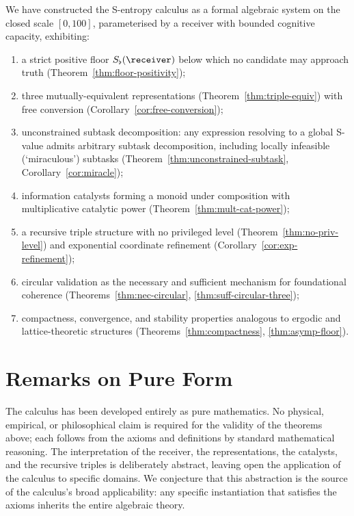 \documentclass[11pt,a4paper]{article}
\theoremstyle{thmstyle}
\theoremstyle{thmstyle}
\theoremstyle{definition}
\theoremstyle{remark}
\newcommand{\Sfloor}{S_{\flat}}
\begin{document}
We have constructed the S-entropy calculus as a
formal algebraic system on the closed scale
$[0, 100]$, parameterised by a receiver with
bounded cognitive capacity, exhibiting:

\begin{enumerate}[label=\textbf{(\arabic*)},leftmargin=*]
\item a strict positive floor $\Sfloor(\receiver)$
      below which no candidate may approach truth
      (Theorem~\ref{thm:floor-positivity});
\item three mutually-equivalent representations
      (Theorem~\ref{thm:triple-equiv}) with free
      conversion (Corollary~\ref{cor:free-conversion});
\item unconstrained subtask decomposition: any
      expression resolving to a global S-value
      admits arbitrary subtask decomposition,
      including locally infeasible (`miraculous')
      subtasks (Theorem~\ref{thm:unconstrained-subtask},
      Corollary~\ref{cor:miracle});
\item information catalysts forming a monoid under
      composition with multiplicative catalytic
      power (Theorem~\ref{thm:mult-cat-power});
\item a recursive triple structure with no
      privileged level (Theorem~\ref{thm:no-priv-level})
      and exponential coordinate refinement
      (Corollary~\ref{cor:exp-refinement});
\item circular validation as the necessary and
      sufficient mechanism for foundational
      coherence (Theorems~\ref{thm:nec-circular},
      \ref{thm:suff-circular-three});
\item compactness, convergence, and stability
      properties analogous to ergodic and
      lattice-theoretic structures
      (Theorems~\ref{thm:compactness},
      \ref{thm:asymp-floor}).
\end{enumerate}

\section{Remarks on Pure Form}
\label{sec:pure-form}

The calculus has been developed entirely as pure
mathematics.  No physical, empirical, or
philosophical claim is required for the validity of
the theorems above; each follows from the axioms
and definitions by standard mathematical reasoning.
The interpretation of the receiver, the
representations, the catalysts, and the recursive
triples is deliberately abstract, leaving open the
application of the calculus to specific domains.
We conjecture that this abstraction is the source
of the calculus's broad applicability: any
specific instantiation that satisfies the axioms
inherits the entire algebraic theory.
\end{document}
